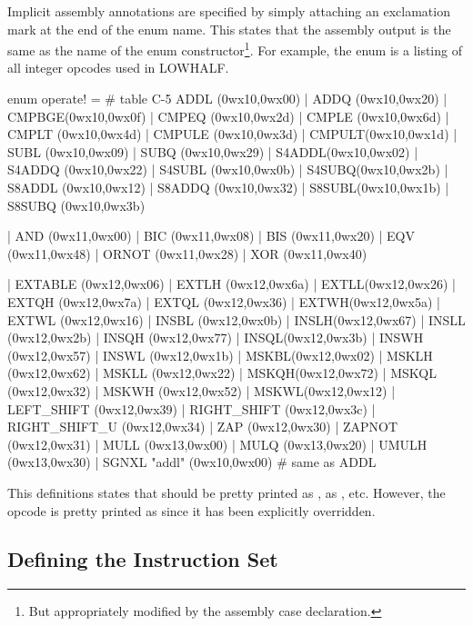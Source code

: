 Implicit assembly annotations are specified by simply attaching 
an exclamation mark at the end of the enum name.  This states
that the assembly output is the same as the name of the enum 
constructor\footnote{But appropriately modified by the assembly case 
declaration.}. For example,
the enum  is a listing of all integer opcodes 
used in LOWHALF.  
\begin{SML}
   enum operate! = #  table C-5 
       ADDL  (0wx10,0wx00)                       | ADDQ (0wx10,0wx20)
                           | CMPBGE(0wx10,0wx0f) | CMPEQ (0wx10,0wx2d)
     | CMPLE (0wx10,0wx6d) | CMPLT (0wx10,0wx4d) | CMPULE (0wx10,0wx3d)
     | CMPULT(0wx10,0wx1d) | SUBL  (0wx10,0wx09)
     | SUBQ  (0wx10,0wx29)
     | S4ADDL(0wx10,0wx02) | S4ADDQ (0wx10,0wx22) | S4SUBL (0wx10,0wx0b)
     | S4SUBQ(0wx10,0wx2b) | S8ADDL (0wx10,0wx12) | S8ADDQ (0wx10,0wx32)
     | S8SUBL(0wx10,0wx1b) | S8SUBQ (0wx10,0wx3b)

     | AND   (0wx11,0wx00) | BIC    (0wx11,0wx08) | BIS (0wx11,0wx20)
                                                  | EQV (0wx11,0wx48)
     | ORNOT (0wx11,0wx28) | XOR    (0wx11,0wx40)

     | EXTABLE (0wx12,0wx06) | EXTLH  (0wx12,0wx6a) | EXTLL(0wx12,0wx26)
     | EXTQH (0wx12,0wx7a) | EXTQL  (0wx12,0wx36) | EXTWH(0wx12,0wx5a)
     | EXTWL (0wx12,0wx16) | INSBL  (0wx12,0wx0b) | INSLH(0wx12,0wx67)
     | INSLL (0wx12,0wx2b) | INSQH  (0wx12,0wx77) | INSQL(0wx12,0wx3b)
     | INSWH (0wx12,0wx57) | INSWL  (0wx12,0wx1b) | MSKBL(0wx12,0wx02)
     | MSKLH (0wx12,0wx62) | MSKLL  (0wx12,0wx22) | MSKQH(0wx12,0wx72)
     | MSKQL (0wx12,0wx32) | MSKWH  (0wx12,0wx52) | MSKWL(0wx12,0wx12)
     | LEFT_SHIFT   (0wx12,0wx39) | RIGHT_SHIFT    (0wx12,0wx3c) | RIGHT_SHIFT_U  (0wx12,0wx34)
     | ZAP   (0wx12,0wx30) | ZAPNOT (0wx12,0wx31)
     | MULL  (0wx13,0wx00)                        | MULQ (0wx13,0wx20)
                           | UMULH  (0wx13,0wx30)
     | SGNXL "addl" (0wx10,0wx00) #  same as ADDL 
\end{SML}
This definitions states that  should be pretty printed
as ,  as , etc.  However, the opcode 
 is pretty printed as  since it has been explicitly
overridden.

\subsection{Defining the Instruction Set}

